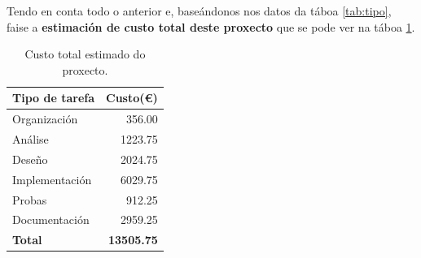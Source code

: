 Tendo en conta todo o anterior e, baseándonos nos datos da táboa \ref{tab:tipo}, faise a \textbf{estimación de custo total deste proxecto} que se pode ver na táboa \ref{tab:custo_final}.


\begin{table}[H]
	\centering
	\begin{tabular}{|p{8cm}|r|}
		\hline
		\rowcolor{blue!10}
		Tipo de tarefa & Custo(€)\\
		\hline
		Organización & 356.00\\
		\hline
		Análise & 1223.75\\
		\hline
		Deseño &  2024.75\\
		\hline
		Implementación &  6029.75\\
		\hline
		Probas &  912.25\\
		\hline
		Documentación &  2959.25\\
		\hline
		\textbf{Total} &  \textbf{13505.75}\\
		\hline
	\end{tabular}
	\caption{Custo total estimado do proxecto.}
	\label{tab:custo_final}
\end{table}

